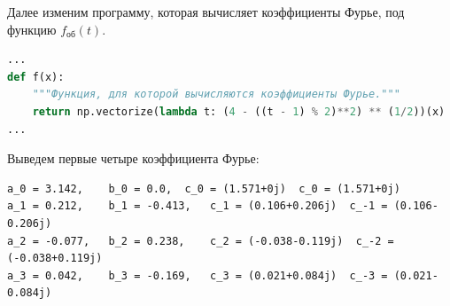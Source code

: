 \documentclass[a4paper]{article}
\begin{document}
Далее изменим программу, которая вычисляет коэффициенты Фурье, под функцию $f_\text{об}(t)$.
\begin{lstlisting}[language=Python, caption={Вычисление коэффициентов Фурье для функции $f_\text{об}(t)$}]
...
def f(x):
    """Функция, для которой вычисляются коэффициенты Фурье."""
    return np.vectorize(lambda t: (4 - ((t - 1) % 2)**2) ** (1/2))(x)
...   
\end{lstlisting}

Выведем первые четыре коэффициента Фурье: 
\begin{lstlisting}[caption=Вывод программы]
a_0 = 3.142,	b_0 = 0.0,	c_0 = (1.571+0j)  c_0 = (1.571+0j)
a_1 = 0.212,	b_1 = -0.413,	c_1 = (0.106+0.206j)  c_-1 = (0.106-0.206j)
a_2 = -0.077,	b_2 = 0.238,	c_2 = (-0.038-0.119j)  c_-2 = (-0.038+0.119j)
a_3 = 0.042,	b_3 = -0.169,	c_3 = (0.021+0.084j)  c_-3 = (0.021-0.084j)
\end{lstlisting}
\end{document}
